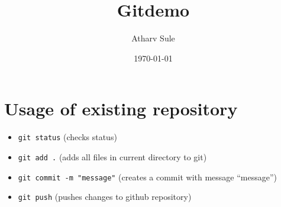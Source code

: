 \documentclass[11pt]{article}
\author{Atharv Sule}
\date{\today}
\title{Gitdemo}
\begin{document}
\maketitle
\tableofcontents



\section{Usage of existing repository}
\label{sec:org068c7a6}

\begin{itemize}
\item \texttt{git status}  (checks status)
\item \texttt{git add .} (adds all files in current directory to git)
\item \texttt{git commit -m "message"} (creates a commit with message ``message'')
\item \texttt{git push} (pushes changes to github repository)
\end{itemize}
\end{document}
